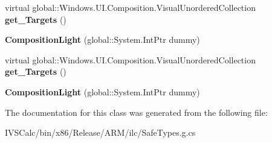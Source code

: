 \begin{DoxyCompactItemize}
virtual global\+::\+Windows.\+U\+I.\+Composition.\+Visual\+Unordered\+Collection {\bfseries get\+\_\+\+Targets} ()
\item 
\mbox{\label{class_windows_1_1_u_i_1_1_composition_1_1_composition_light_a7cbe3c2b1c2016f76203e9cd55b6e13f}} 
{\bfseries Composition\+Light} (global\+::\+System.\+Int\+Ptr dummy)
\item 
\mbox{\label{class_windows_1_1_u_i_1_1_composition_1_1_composition_light_a93b7a417f075085ffa35bf1cc7425e81}} 
virtual global\+::\+Windows.\+U\+I.\+Composition.\+Visual\+Unordered\+Collection {\bfseries get\+\_\+\+Targets} ()
\item 
\mbox{\label{class_windows_1_1_u_i_1_1_composition_1_1_composition_light_a7cbe3c2b1c2016f76203e9cd55b6e13f}} 
{\bfseries Composition\+Light} (global\+::\+System.\+Int\+Ptr dummy)
\end{DoxyCompactItemize}


The documentation for this class was generated from the following file\+:\begin{DoxyCompactItemize}
\item 
I\+V\+S\+Calc/bin/x86/\+Release/\+A\+R\+M/ilc/Safe\+Types.\+g.\+cs\end{DoxyCompactItemize}
